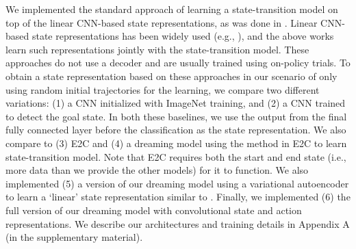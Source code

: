 \documentclass[letterpaper, 10 pt, conference]{ieeeconf}
\newcommand{\mryoo}[1]{\fxnote{\hl{Michael: #1}}}
\begin{document}
We implemented the standard approach of learning a state-transition model on top of the linear CNN-based state representations, as was done in \cite{heess2015learning,oh2017value,weber2017imagination}. Linear CNN-based state representations has been widely used (e.g., \cite{mnih2013playing}), and the above works learn such representations jointly with the state-transition model.
These approaches do not use a decoder and are usually trained using on-policy trials. To obtain a state representation based on these approaches in our scenario of only using random initial trajectories for the learning, we compare two different variations: (1)
a CNN initialized with ImageNet \cite{deng2009imagenet} training, and (2) a CNN trained to detect the goal state. In both these baselines, we use the output from the final fully connected layer before the classification as the state representation. We also compare to (3) E2C \cite{watter2015embed} and (4) a dreaming model using the method in E2C to learn state-transition model. Note that E2C requires both the start and end state (i.e., more data than we provide the other models) for it to function.
We also implemented (5) a version of our dreaming model using a variational autoencoder to learn a `linear' state representation similar to \cite{ha2018world}.
Finally, we implemented (6) the full version of our dreaming model with convolutional state and action representations. We describe our architectures and training details in Appendix A (in the supplementary material).


\end{document}

